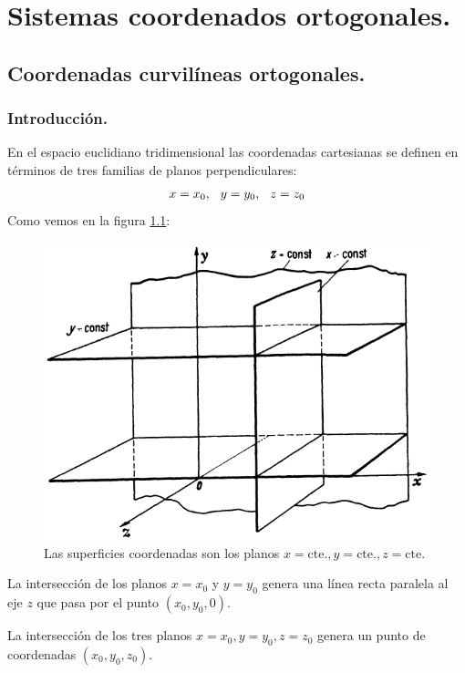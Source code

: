 \chapter{Sistemas coordenados ortogonales.}

\section{Coordenadas curvilíneas ortogonales.}
\subsection{Introducción.}

En el espacio euclidiano tridimensional las coordenadas cartesianas se definen en términos de tres familias de planos perpendiculares:
\begin{align*}
x = x_{0}, \hspace{0.25cm} y = y_{0}, \hspace{0.25cm} z = z_{0}
\end{align*}
Como vemos en la figura \ref{fig:figura_planos_cartesianos}:
\begin{figure}[H]
   \centering
   \includegraphics[scale=1.5]{Imagenes/Planos_Coordenadas_Cartesianas.png}
   \caption{Las superficies coordenadas son los planos $x=\mbox{cte.}, y=\mbox{cte.}, z=\mbox{cte.}$}
   \label{fig:figura_planos_cartesianos}
\end{figure}
La intersección de los planos $x = x_{0}$ y $y = y_{0}$ genera una línea recta paralela al eje $z$
que pasa por el punto $(x_{0}, y_{0}, 0)$.
\par
La intersección de los tres planos $x = x_{0}, y = y_{0}, z = z_{0}$ genera un punto de coordenadas $(x_{0}, y_{0}, z_{0})$.

